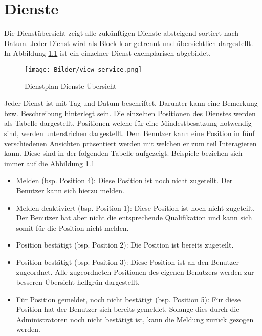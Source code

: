 \chapter{Dienste}
\label{cha:dienste}
Die Dienstübersicht zeigt alle zukünftigen Dienste absteigend sortiert nach Datum. Jeder Dienst wird als Block klar getrennt und übersichtlich dargestellt. In Abbildung \ref{fig:view_service} \textit{} ist ein einzelner Dienst exemplarisch abgebildet.

\begin{figure}[h]
 \begin{addmargin}{-0.2\linewidth}
   \centering 
   \texttt{[image: Bilder/view\_service.png]}
 \end{addmargin} 
 \caption[Dienste Übersicht]{Dienstplan Dienste Übersicht}
 \label{fig:view_service}
\end{figure}

\noindent Jeder Dienst ist mit Tag und Datum beschriftet. Darunter kann eine Bemerkung bzw. Beschreibung hinterlegt sein. Die einzelnen Positionen des Dienstes werden als Tabelle dargestellt. Positionen welche für eine Mindestbesatzung notwendig sind, werden unterstrichen dargestellt.
\noindent Dem Benutzer kann eine Position in fünf verschiedenen Ansichten präsentiert werden mit welchen er zum teil Interagieren kann.
Diese sind in der folgenden Tabelle aufgezeigt. Beispiele beziehen sich immer auf die Abbildung \ref{fig:view_service} \textit{}

\begin{itemize}
\item Melden (bsp. Position 4): Diese Position ist noch nicht zugeteilt. Der Benutzer kann sich hierzu melden.
\item Melden deaktiviert (bsp. Position 1): Diese Position ist noch nicht zugeteilt. Der Benutzer hat aber nicht die entsprechende Qualifikation und kann sich somit für die Position nicht melden.
\item Position bestätigt (bsp. Position 2): Die Position ist bereits zugeteilt.
\item Position bestätigt (bsp. Position 3): Diese Position ist an den Benutzer zugeordnet. Alle zugeordneten Positionen des eigenen Benutzers werden zur besseren Übersicht hellgrün dargestellt.
\item Für Position gemeldet, noch nicht bestätigt (bsp. Position 5): Für diese Position hat der Benutzer sich bereits gemeldet. Solange dies durch die Administratoren noch nicht bestätigt ist, kann die Meldung zurück gezogen werden.
\end{itemize}

